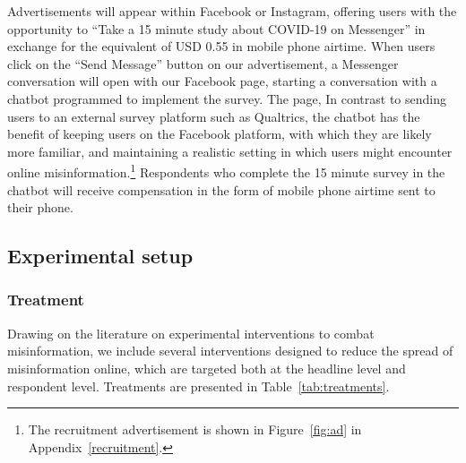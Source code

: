 \documentclass[letterpaper, 12pt, parskip=full,DIV=12]{scrartcl}
\begin{document}
Advertisements will appear within Facebook or Instagram, offering users with the opportunity to ``Take a 15 minute study about COVID-19 on Messenger'' in exchange for the equivalent of USD 0.55 in mobile phone airtime. When users click on the ``Send Message'' button on our advertisement, a Messenger conversation will open with our Facebook page, starting a conversation with a chatbot programmed to implement the survey. The page, In contrast to sending users to an external survey platform such as Qualtrics, the chatbot has the benefit of keeping users on the Facebook platform, with which they are likely more familiar, and maintaining a realistic setting in which users might encounter online misinformation.\footnote{The recruitment advertisement is shown in Figure~\ref{fig:ad} in Appendix~\ref{recruitment}. \color{red}{[[Add images of chatbot once linked to page]]}} Respondents who complete the 15 minute survey in the chatbot will receive compensation in the form of mobile phone airtime sent to their phone. %

\subsection{Experimental setup}

\subsubsection{Treatment}
Drawing on the literature on experimental interventions to combat misinformation, we include several interventions designed to reduce the spread of misinformation online, which are targeted both at the headline level and respondent level. Treatments are presented in Table~\ref{tab:treatments}. 
\end{document}

